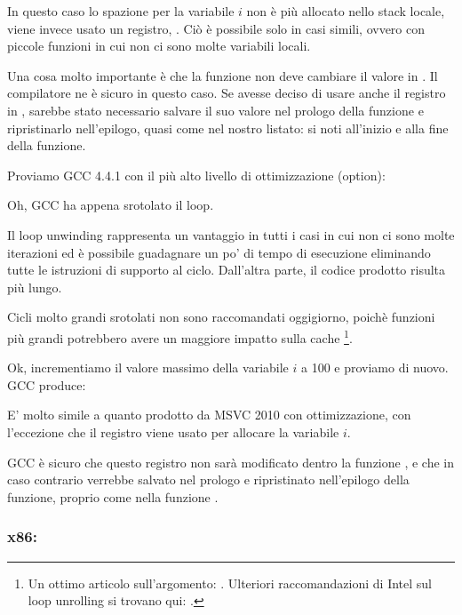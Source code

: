 In questo caso lo spazione per la variabile $i$ non è più allocato nello stack locale, viene invece usato un registro, \ESI.
Ciò è possibile solo in casi simili, ovvero con piccole funzioni in cui non ci sono molte variabili locali.

Una cosa molto importante è che la funzione \ttf non deve cambiare il valore in \ESI.
Il compilatore ne è sicuro in questo caso.
Se avesse deciso di usare anche il registro \ESI in \ttf, sarebbe stato necessario salvare il suo valore nel prologo della funzione
e ripristinarlo nell'epilogo, quasi come nel nostro listato: si noti 
all'inizio e alla fine della funzione.

Proviamo GCC 4.4.1 con il più alto livello di ottimizzazione (\Othree option):




Oh, GCC ha appena srotolato il loop.

Il \Gls{loop unwinding} rappresenta un vantaggio in tutti i casi in cui non ci sono molte iterazioni ed è possibile guadagnare un po'
di tempo di esecuzione eliminando tutte le istruzioni di supporto al ciclo.
Dall'altra parte, il codice prodotto risulta più lungo.


Cicli molto grandi srotolati non sono raccomandati oggigiorno, poichè funzioni più grandi potrebbero avere un maggiore impatto sulla cache%
%
\footnote{Un ottimo articolo sull'argomento: \DrepperMemory.
Ulteriori raccomandazioni di Intel sul loop unrolling si trovano qui: 
.}.

Ok, incrementiamo il valore massimo della variabile $i$ a 100 e proviamo di nuovo. GCC produce:



E' molto simile a quanto prodotto da MSVC 2010 con ottimizzazione, con l'eccezione che il registro \EBX viene usato per allocare la variabile $i$.

GCC è sicuro che questo registro non sarà modificato dentro la funzione \ttf, e che in caso contrario verrebbe salvato nel prologo e ripristinato nell'epilogo della funzione,
proprio come nella funzione \main.

\clearpage
\subsubsection{x86: \olly}
\myindex{\olly}

